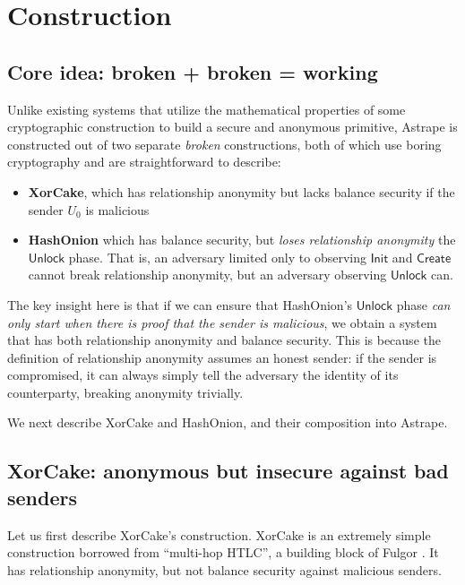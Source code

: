 \documentclass[USenglish,oneside,twocolumn]{article}
\begin{document}
\section{Construction} \label{sec:construct}

\subsection{Core idea: broken + broken = working}

Unlike existing systems that utilize the mathematical properties of some cryptographic construction to build a secure and anonymous primitive, Astrape is constructed out of two separate \emph{broken} constructions, both of which use boring cryptography and are straightforward to describe:
\begin{itemize}
    \item \textbf{XorCake}, which has relationship anonymity but lacks balance security if the sender $U_0$ is malicious
    \item \textbf{HashOnion} which has balance security, but \emph{loses relationship anonymity} the $\mathsf{Unlock}$ phase. That is, an adversary limited only to observing $\mathsf{Init}$ and $\mathsf{Create}$ cannot break relationship anonymity, but an adversary observing $\mathsf{Unlock}$ can.
\end{itemize}

The key insight here is that if we can ensure that HashOnion's $\mathsf{Unlock}$ phase \emph{can only start when there is proof that the sender is malicious}, we obtain a system that has both relationship anonymity and balance security. This is because the definition of relationship anonymity assumes an honest sender: if the sender is compromised, it can always simply tell the adversary the identity of its counterparty, breaking anonymity trivially.

We next describe XorCake and HashOnion, and their composition into Astrape.

\subsection{XorCake: anonymous but insecure against bad senders}

Let us first describe XorCake's construction. XorCake is an extremely simple construction borrowed from ``multi-hop HTLC'', a building block of Fulgor \cite{malavolta2017concurrency}. It has relationship anonymity, but not balance security against malicious senders.
\end{document}
